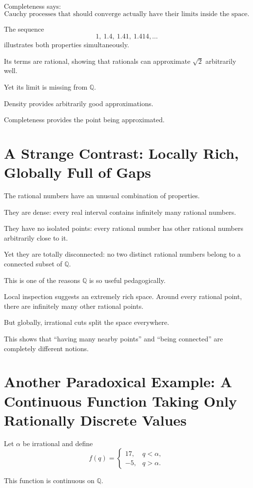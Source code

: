 \documentclass{essay}
\begin{document}
Completeness says:
\[ \text{Cauchy processes that should converge actually have their limits inside the space.} \]

The sequence
\[ 1,\ 1.4,\ 1.41,\ 1.414,\ldots \]
illustrates both properties simultaneously.

Its terms are rational, showing that rationals can approximate \(\sqrt{2}\)
arbitrarily well.

Yet its limit is missing from \(\mathbb{Q}\).

Density provides arbitrarily good approximations.

Completeness provides the point being approximated.

\section{A Strange Contrast: Locally Rich, Globally Full of Gaps}

The rational numbers have an unusual combination of properties.

They are dense:
every real interval contains infinitely many rational numbers.

They have no isolated points:
every rational number has other rational numbers arbitrarily close to it.

Yet they are totally disconnected:
no two distinct rational numbers belong to a connected subset of
\(\mathbb{Q}\).

This is one of the reasons \(\mathbb{Q}\) is so useful pedagogically.

Local inspection suggests an extremely rich space. Around every rational
point, there are infinitely many other rational points.

But globally, irrational cuts split the space everywhere.

This shows that ``having many nearby points'' and ``being connected'' are
completely different notions.

\section{Another Paradoxical Example: A Continuous Function Taking Only
Rationally Discrete Values}

Let \(\alpha\) be irrational and define
\[
  f(q)=
  \begin{cases}
    17,&q<\alpha,\\
    -5,&q>\alpha.
  \end{cases}
\]

This function is continuous on \(\mathbb{Q}\).
\end{document}
